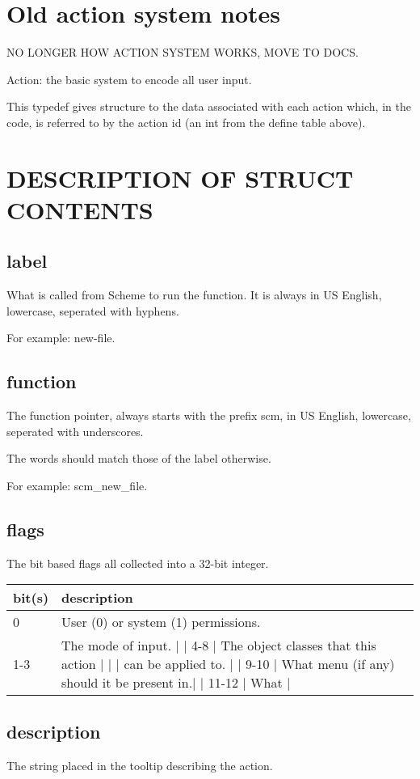 \section{Old action system notes}

NO LONGER HOW ACTION SYSTEM WORKS, MOVE TO DOCS.

Action: the basic system to encode all user input.

This typedef gives structure to the data associated with each action
which, in the code, is referred to by the action id (an int from
the define table above).

\section{DESCRIPTION OF STRUCT CONTENTS}

\subsection{label}

What is called from Scheme to run the function.
It is always in US English, lowercase,
seperated with hyphens.

For example: new-file.

\subsection{function}

The function pointer, always starts with the prefix scm,
in US English, lowercase, seperated with underscores.

The words should match those of the label otherwise.

For example: scm\_new\_file.

\subsection{flags}

The bit based flags all collected into a 32-bit integer.

\begin{longtable}{l l}
bit(s) & description \\
\hline
0 & User (0) or system (1) permissions. \\
1-3 & The mode of input.                         |
| 4-8    | The object classes that this action        |
|        | can be applied to.                         |
| 9-10   | What menu (if any) should it be present in.|
| 11-12  | What                                       |
\end{longtable}

\subsection{description}

The string placed in the tooltip describing the action.